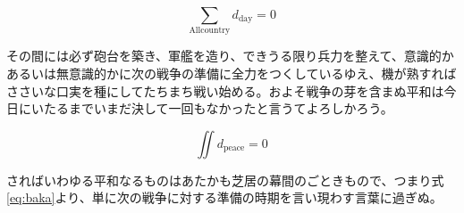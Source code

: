 \[\sum_{\mathrm{All country}} d_{\mathrm{day}} = 0 \]

その間には必ず砲台を築き、軍艦を造り、できうる限り兵力を整えて、意識的かあるいは無意識的かに次の戦争の準備に全力をつくしているゆえ、機が熟すればささいな口実を種にしてたちまち戦い始める。およそ戦争の芽を含まぬ平和は今日にいたるまでいまだ決して一回もなかったと言うてよろしかろう。

\begin{equation}
	\iint  d_{\mathrm{peace}} = 0 \label{eq:baka}
\end{equation}

さればいわゆる平和なるものはあたかも芝居の幕間のごときもので、つまり式\ref{eq:baka}より、単に次の戦争に対する準備の時期を言い現わす言葉に過ぎぬ。
